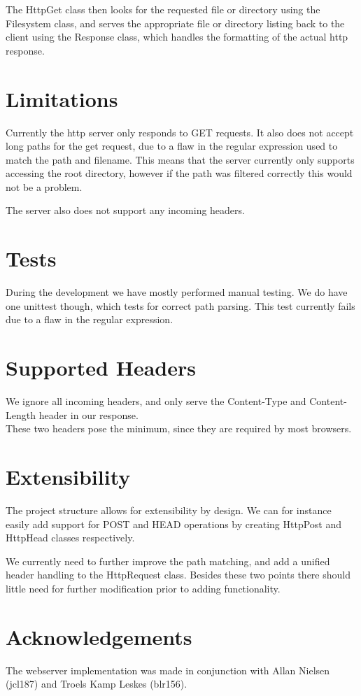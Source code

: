 \documentclass{acm_proc_article-sp}
\begin{document}
The HttpGet class then looks for the requested file or directory using the Filesystem class, and serves the appropriate file or directory listing back to the client using the Response class, which handles the formatting of the actual http response.

\section{Limitations}
Currently the http server only responds to GET requests. It also does not accept long paths for the get request, due to a flaw in the regular expression used to match the path and filename. This means that the server currently only supports accessing the root directory, however if the path was filtered correctly this would not be a problem.

The server also does not support any incoming headers. 

\section{Tests}
During the development we have mostly performed manual testing. We do have one unittest though, which tests for correct path parsing. This test currently fails due to a flaw in the regular expression.

\section{Supported Headers}
We ignore all incoming headers, and only serve the Content-Type and Content-Length header in our response.\\
These two headers pose the minimum, since they are required by most browsers.

\section{Extensibility}
The project structure allows for extensibility by design. We can for instance easily add support for POST and HEAD operations by creating HttpPost and HttpHead classes respectively.

We currently need to further improve the path matching, and add a unified header handling to the HttpRequest class. Besides these two points there should little need for further modification prior to adding functionality.

\section{Acknowledgements}
The webserver implementation was made in conjunction with Allan Nielsen (jcl187) and Troels Kamp Leskes (blr156). 
\end{document}
